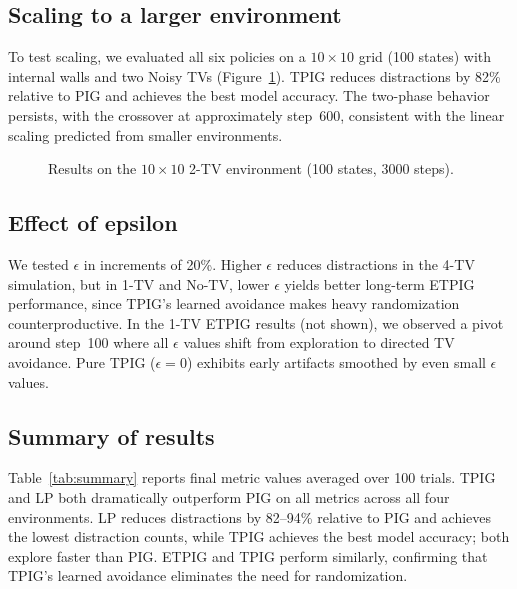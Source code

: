 \documentclass[letterpaper]{article}
\begin{document}
\subsection{Scaling to a larger environment}

To test scaling, we evaluated all six policies on a $10 \times 10$
grid (100 states) with internal walls and two Noisy TVs
(Figure~\ref{Fig:10x10}).  TPIG reduces distractions by 82\% relative
to PIG and achieves the best model accuracy.  The two-phase behavior
persists, with the crossover at approximately step~600, consistent
with the linear scaling predicted from smaller environments.

\newsavebox{\DRtenTV}\newsavebox{\MAtenTV}
\sbox{\DRtenTV}{}
\sbox{\MAtenTV}{}
\begin{figure}
  \centering
  \hfill
  \caption{Results on the $10 \times 10$ 2-TV environment (100 states, 3000 steps).}
  \label{Fig:10x10}
\end{figure}

\subsection{Effect of epsilon}

We tested $\epsilon$ in increments of 20\%.  Higher $\epsilon$ reduces
distractions in the 4-TV simulation, but in 1-TV and No-TV, lower
$\epsilon$ yields better long-term ETPIG performance, since TPIG's
learned avoidance makes heavy randomization counterproductive.  In the
1-TV ETPIG results (not shown), we observed a pivot around step~100
where all $\epsilon$ values shift from exploration to directed TV
avoidance.  Pure TPIG ($\epsilon = 0$) exhibits early artifacts
smoothed by even small $\epsilon$ values.

\subsection{Summary of results}

Table~\ref{tab:summary} reports final metric values averaged over 100
trials.  TPIG and LP both dramatically outperform PIG on all metrics
across all four environments.  LP reduces distractions by 82--94\% relative to PIG and achieves the
lowest distraction counts, while TPIG achieves the best model
accuracy; both explore faster than PIG.  ETPIG and TPIG perform similarly, confirming that
TPIG's learned avoidance eliminates the need for randomization.
\end{document}
